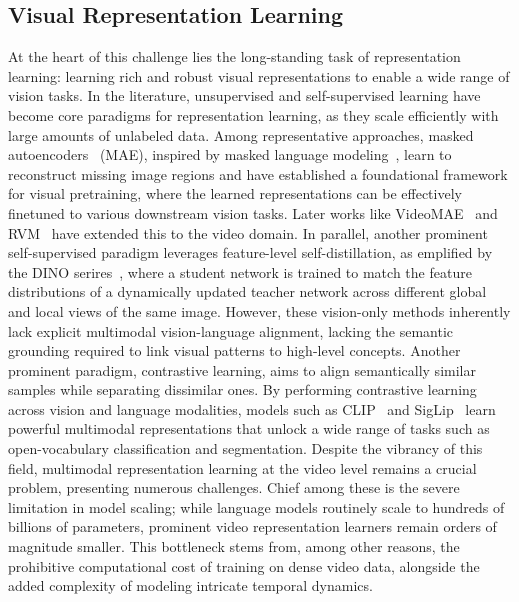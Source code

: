 \documentclass[11pt, a4paper, logo, onecolumn]{googledeepmind}
\begin{document}
\subsection{Visual Representation Learning}
At the heart of this challenge lies the long-standing task of representation learning: learning rich and robust visual representations to enable a wide range of vision tasks. In the literature, unsupervised and self-supervised learning have become core paradigms for representation learning, as they scale efficiently with large amounts of unlabeled data. Among representative approaches, masked autoencoders~\cite{he2022masked,pathak2016context} (MAE), inspired by masked language modeling~\cite{devlin2019bert,brown2020language}, learn to reconstruct missing image regions and have established a foundational framework for visual pretraining, where the learned representations can be effectively finetuned to various downstream vision tasks. 
Later works like VideoMAE~\cite{tong2022videomae} and RVM~\cite{zoran2025recurrent} have extended this to the video domain.
In parallel, another prominent self-supervised paradigm leverages feature-level self-distillation, as emplified by the DINO serires~\cite{caron2021emerging,oquab2023dinov2,simeoni2025dinov3}, 
where a student network is trained to match the feature distributions of a dynamically updated teacher network across different global and local views of the same image.
However, these vision-only methods inherently lack explicit multimodal vision-language alignment, lacking the semantic grounding required to link visual patterns to high-level concepts.
Another prominent paradigm, contrastive learning, aims to align semantically similar samples while separating dissimilar ones. By performing contrastive learning across vision and language modalities, models such as CLIP~\cite{radford2021learning} and SigLip~\cite{zhai2023sigmoid} learn powerful multimodal representations that unlock a wide range of tasks such as open-vocabulary classification and segmentation. 
Despite the vibrancy of this field, multimodal representation learning at the video level remains a crucial problem, presenting numerous challenges.
Chief among these is the severe limitation in model scaling; while language models routinely scale to hundreds of billions of parameters, prominent video representation learners remain orders of magnitude smaller. This bottleneck stems from, among other reasons, the prohibitive computational cost of training on dense video data, alongside the added complexity of modeling intricate temporal dynamics.
\end{document}
